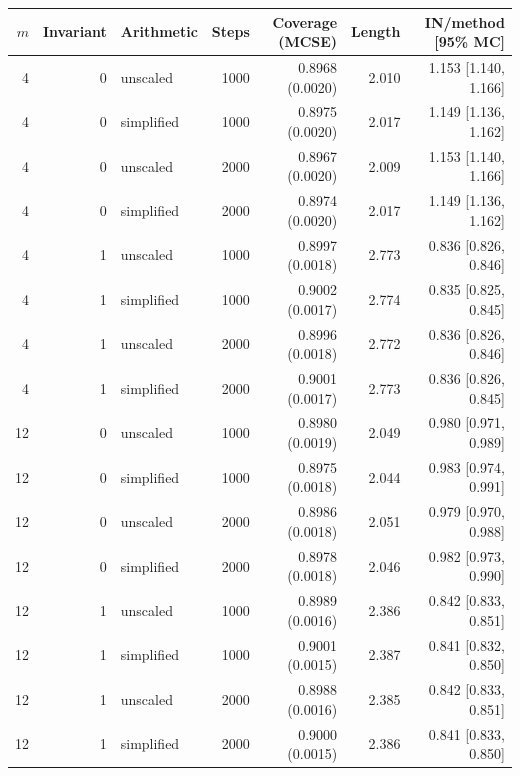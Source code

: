 \begin{longtable}{rrlrrrr}
\toprule
$m$ & Invariant & Arithmetic & Steps & Coverage (MCSE) & Length & IN/method [95\% MC] \\
\midrule
\endhead
4 & 0 & unscaled & 1000 & 0.8968 (0.0020) & 2.010 & 1.153 [1.140, 1.166]\\
4 & 0 & simplified & 1000 & 0.8975 (0.0020) & 2.017 & 1.149 [1.136, 1.162]\\
4 & 0 & unscaled & 2000 & 0.8967 (0.0020) & 2.009 & 1.153 [1.140, 1.166]\\
4 & 0 & simplified & 2000 & 0.8974 (0.0020) & 2.017 & 1.149 [1.136, 1.162]\\
4 & 1 & unscaled & 1000 & 0.8997 (0.0018) & 2.773 & 0.836 [0.826, 0.846]\\
4 & 1 & simplified & 1000 & 0.9002 (0.0017) & 2.774 & 0.835 [0.825, 0.845]\\
4 & 1 & unscaled & 2000 & 0.8996 (0.0018) & 2.772 & 0.836 [0.826, 0.846]\\
4 & 1 & simplified & 2000 & 0.9001 (0.0017) & 2.773 & 0.836 [0.826, 0.845]\\
12 & 0 & unscaled & 1000 & 0.8980 (0.0019) & 2.049 & 0.980 [0.971, 0.989]\\
12 & 0 & simplified & 1000 & 0.8975 (0.0018) & 2.044 & 0.983 [0.974, 0.991]\\
12 & 0 & unscaled & 2000 & 0.8986 (0.0018) & 2.051 & 0.979 [0.970, 0.988]\\
12 & 0 & simplified & 2000 & 0.8978 (0.0018) & 2.046 & 0.982 [0.973, 0.990]\\
12 & 1 & unscaled & 1000 & 0.8989 (0.0016) & 2.386 & 0.842 [0.833, 0.851]\\
12 & 1 & simplified & 1000 & 0.9001 (0.0015) & 2.387 & 0.841 [0.832, 0.850]\\
12 & 1 & unscaled & 2000 & 0.8988 (0.0016) & 2.385 & 0.842 [0.833, 0.851]\\
12 & 1 & simplified & 2000 & 0.9000 (0.0015) & 2.386 & 0.841 [0.833, 0.850]\\
\bottomrule
\end{longtable}
